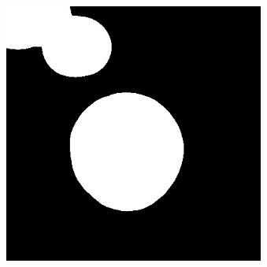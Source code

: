 \documentclass{beamer}
\begin{document}
\begin{frame}
\begin{columns}
\begin{figure}
\begin{center}
		\end{center}
		\end{figure}
		\begin{figure}
		\begin{center}
		\includegraphics[scale=0.25]{otwarcie2.jpg}
		\end{center}
		\end{figure}
\end{columns}
\end{frame}

\end{document}

